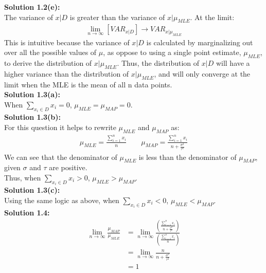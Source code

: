 \documentclass[submit]{harvardml}
\begin{document}
\noindent\textbf{Solution 1.2(e):}\\
The variance of $x|D$ is greater than the variance of $x|\mu_{MLE}$. At the limit:
\begin{align*}
    \lim_{n\to\infty}[VAR_{x|D}]\to VAR_{x|\mu_{MLE}}
\end{align*}
This is intuitive because the variance of $x|D$ is calculated by marginalizing out over all the possible values of $\mu$, as oppose to using a single point estimate, $\mu_{MLE}$, to derive the distribution of $x|\mu_{MLE}$. Thus, the distribution of $x|D$ will have a higher variance than the distribution of $x|\mu_{MLE}$, and will only converge at the limit when the MLE is the mean of all n data points.\\

\noindent\textbf{Solution 1.3(a):}\\
When $\sum_{x_i \in D} x_i=0$, $\mu_{MLE} = \mu_{MAP} = 0$.\\

\noindent\textbf{Solution 1.3(b):}\\
For this question it helps to rewrite $\mu_{MLE}$ and $\mu_{MAP}$ as:
\begin{align*}
    \mu_{MLE} = \frac{\sum_{i=1}^n x_i}{n} \qquad \mu_{MAP} = \frac{\sum_{i=1}^n x_i}{n + \frac{\sigma^2}{\tau^2}}
\end{align*}
We can see that the denominator of $\mu_{MLE}$ is less than the denominator of $\mu_{MAP}$, given $\sigma$ and $\tau$ are positive.\\
Thus, when $\sum_{x_i \in D} x_i>0$, $\mu_{MLE} > \mu_{MAP}$.\\

\noindent\textbf{Solution 1.3(c):}\\
Using the same logic as above, when $\sum_{x_i \in D} x_i<0$, $\mu_{MLE} < \mu_{MAP}$.\\

\noindent\textbf{Solution 1.4:}\\
\begin{align*}
    \lim_{n \rightarrow \infty} \frac{\mu_{MAP}}{\mu_{MLE}} &= \lim_{n \rightarrow \infty} \frac{\left(\frac{\sum_{i=1}^n x_i}{n + \frac{\sigma^2}{\tau^2}}\right)}{\left(\frac{\sum_{i=1}^n x_i}{n}\right)}\\
    &= \lim_{n \rightarrow \infty} \frac{n}{n + \frac{\sigma^2}{\tau^2}}\\
    &= 1
\end{align*}
\end{document}
